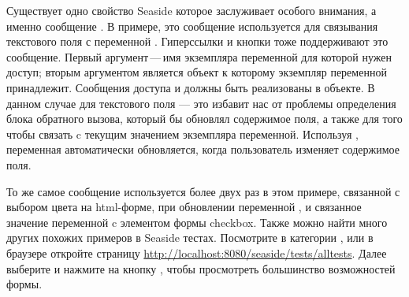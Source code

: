 \documentclass[a4paper,10pt,twoside]{book}
\begin{document}

Существует одно свойство Seaside которое заслуживает особого внимания,
а именно сообщение .
В примере,
это сообщение используется для связывания текстового
поля с переменной .
Гиперссылки и кнопки тоже поддерживают это сообщение.
Первый аргумент\,---\,имя экземпляра переменной для которой нужен доступ;
вторым аргументом является объект
к которому экземпляр переменной принадлежит.
Сообщения доступа  и 
должны быть реализованы в объекте.
В данном случае для текстового поля ---
это избавит нас от проблемы определения блока обратного вызова,
который бы обновлял содержимое поля, а также для того
чтобы связать c текущим значением экземпляра переменной.
Используя ,
переменная  автоматически обновляется, когда пользователь изменяет содержимое поля.



То же самое сообщение используется более двух раз в этом примере,
связанной с выбором цвета на html-форме,
при обновлении переменной , и связанное значение переменной
 c элементом формы checkbox.
Также можно найти много других похожих примеров в Seaside тестах.
Посмотрите в категории ,
или в браузере откройте страницу
\url{http://localhost:8080/seaside/tests/alltests}.
Далее выберите  и нажмите на кнопку ,
чтобы просмотреть большинство возможностей формы.
\end{document}
